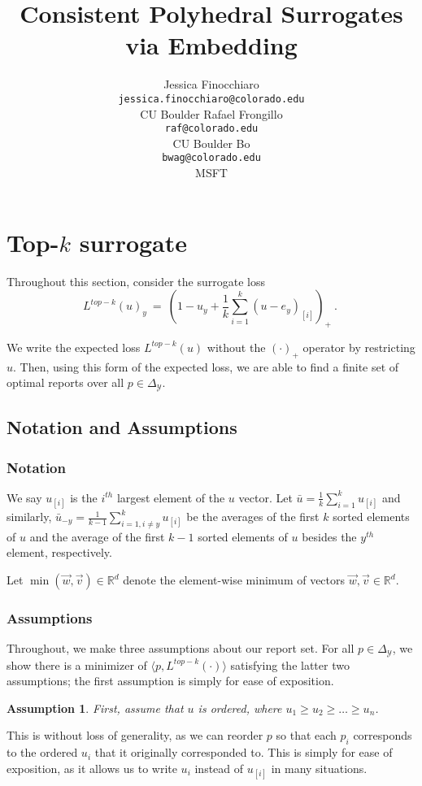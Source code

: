 \documentclass[12pt]{article}
\title{Consistent Polyhedral Surrogates via Embedding}
\author{%
 Jessica Finocchiaro\raf{Jessie?} \\
 \texttt{jessica.finocchiaro@colorado.edu}\\
 CU Boulder
 \And
 Rafael Frongillo\\
 \texttt{raf@colorado.edu}\\
 CU Boulder
 \And
 Bo\\
 \texttt{bwag@colorado.edu}\\
 MSFT
}
\newcommand{\reals}{\mathbb{R}}
\newcommand{\simplex}{\Delta_\Y}
\newcommand{\Y}{\mathcal{Y}}
\newcommand{\inprod}[2]{\langle #1, #2 \rangle}%
\DeclareMathOperator*{\argmax}{arg\,max}
\newtheorem{assumption}{Assumption}
\begin{document}
\section{Top-$k$ surrogate}

Throughout this section, consider the surrogate loss \begin{equation}\label{eq:top-k-surrogate}
L^{top-k}(u)_y~=~\left(1 - u_y + \frac{1}{k} \sum_{i=1}^k (u - e_y)_{[i]} \right)_+~.~
\end{equation}

We write the expected loss $L^{top-k}(u)$ without the $(\cdot)_+$ operator by restricting $u$.
Then, using this form of the expected loss, we are able to find a finite set of optimal reports over all $p \in \simplex$.

\subsection{Notation and Assumptions}
\subsubsection{Notation}
We say $u_{[i]}$ is the $i^{th}$ largest element of the $u$ vector.
Let $\bar{u} = \frac 1 k \sum_{i = 1}^k u_{[i]}$ and similarly, $\bar{u}_{-y} = \frac{1}{k-1} \sum_{i=1, i \neq y}^k u_{[i]}$ be the averages of the first $k$ sorted elements of $u$ and the average of the first $k-1$ sorted elements of $u$ besides the $y^{th}$ element, respectively.

Let $\min(\vec w, \vec v) \in \reals^d$ denote the element-wise minimum of vectors $\vec w, \vec v \in \reals^d$.

\subsubsection{Assumptions}\label{sec:assumptions}
Throughout, we make three assumptions about our report set. 
For all $p \in \simplex$, we show there is a minimizer of $\inprod{p}{L^{top-k}(\cdot)}$ satisfying the latter two assumptions; the first assumption is simply for ease of exposition.

\begin{assumption}\label{assum:ordered-u}
First, assume that $u$ is ordered, where $u_1 \geq u_2 \geq \ldots \geq u_n$.
\end{assumption}
This is without loss of generality, as we can reorder $p$ so that each $p_i$ corresponds to the ordered $u_i$ that it originally corresponded to.
This is simply for ease of exposition, as it allows us to write $u_i$ instead of $u_{[i]}$ in many situations. 
\end{document}

